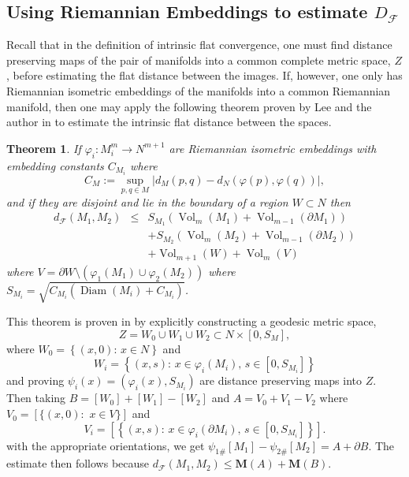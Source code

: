 \documentclass[12pt]{amsart}
\newtheorem{thm}{Theorem}[section]
\begin{document}
\subsection{Using Riemannian Embeddings to estimate $D_{\mathcal{F}}$} 
 
 Recall that in the definition of intrinsic flat convergence, one
 must find distance preserving maps of the pair of manifolds
 into a common complete metric space,
 $Z$, before estimating the flat distance between the images.   
 If, however, one only has Riemannian isometric embeddings of
 the manifolds into a common Riemannian manifold, then one 
 may apply the following theorem proven by Lee and the author
 in \cite{LeeSormani1} to estimate the intrinsic flat distance between the
 spaces.
  
  \begin{thm}\label{embed-const}
If $\varphi_i: M^m_i \to N^{m+1}$ are Riemannian isometric embeddings with 
embedding constants $C_{M_i}$ where
\begin{equation} \label{eqn-embed-const-1}
C_M:= \sup_{p,q\in M} | d_M(p, q) - d_N(\varphi(p),\varphi(q)) |,
\end{equation}
and if
they are disjoint and lie in the boundary of a region $W \subset N$
then
\begin{eqnarray}
d_{\mathcal{F}}(M_1, M_2) &\le& 
S_{M_1}\left({\operatorname{Vol}}_m(M_1)+ {\operatorname{Vol}}_{m-1}(\partial M_1) \right) \\
&&+S_{M_2}\left({\operatorname{Vol}}_m(M_2)+ {\operatorname{Vol}}_{m-1}(\partial M_2) \right)\\
&&+ {\operatorname{Vol}}_{m+1}(W) + {\operatorname{Vol}}_{m}(V)
\end{eqnarray}
where $V= \partial W \setminus \left( \varphi_1(M_1) \cup \varphi_2(M_2)\right)$
where $S_{M_i}= \sqrt{C_{M_i}({\operatorname{Diam}}(M_i)+C_{M_i})}$.
\end{thm}

This theorem is proven in \cite{LeeSormani1} by explicitly constructing
a geodesic metric space,
\begin{equation}
Z= W_0 \cup W_1 \cup W_2 
\subset N \times [0, S_M],
\end{equation}
where $W_0=\left\{(x,0): \,x\in N\right\}$ and
\begin{equation}
W_i=\left\{(x,s): \, x\in \varphi_i(M_i),\, s\in [0, S_{M_i}]\right\}
\end{equation}
and proving $\psi_i(x)=(\varphi_i(x), S_{M_i})$ are distance preserving maps into $Z$.  Then taking $B=[W_0]+[W_1]-[W_2]$ and $A=V_0 + V_1 - V_2$ where
$V_0=[ \{(x,0): \,\, x\in V\}]$ and
\begin{equation}
V_i=[\left\{(x,s): \, x\in \varphi_i(\partial M_i),\, s\in [0, S_{M_i}]\right\}].
\end{equation}
with the appropriate orientations, we get $\psi_{1\#}[M_1]-\psi_{2\#}[M_2]=A +\partial B$. The estimate then follows because $d_{\mathcal{F}}(M_1, M_2)\le {{\mathbf M}}(A) + {{\mathbf M}}(B)$.
 
\end{document}
